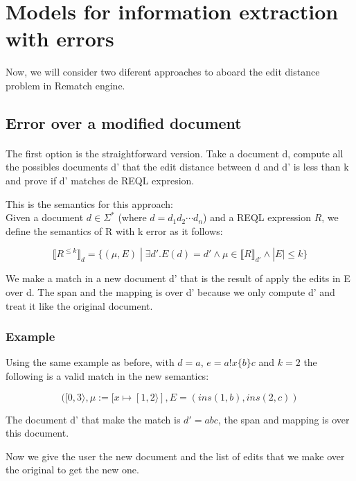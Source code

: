 \documentclass{article}
\begin{document}
\section{Models for information extraction with errors}

Now, we will consider two diferent approaches to aboard the edit distance problem in Rematch engine. 
\subsection{Error over a modified document}

\paragraph{}The first option is the straightforward version. Take a document d, compute all the possibles documents d' that the edit distance between d and d' is less than k and prove if d' matches de REQL expresion.

This is the semantics for this approach: \\

Given a document $d \in \Sigma^*$ (where $d = d_1d_2\cdots d_n$) and a REQL expression $R$, we define the semantics of R with k error as it follows:


\[ \llbracket R^{\leq k} \rrbracket_d = \{(\mu, E) \; | \; \exists d'. E(d) = d' \land \mu \in \llbracket R \rrbracket_{d'} \land | E | \leq k  \}\]


We make a match in a new document d' that is the result of apply the edits in E over d. The span and the mapping is over d' because we only compute d' and treat it like the original document.

\subsubsection{Example}

Using the same example as before, with $d = a$, $e= a!x\{b\}c$ and $k = 2$ the following is a valid match in the new semantics:

\[([0, 3\rangle, \mu := [x \mapsto [1, 2\rangle], E = (ins(1, b), ins(2,c))\]

The document d' that make the  match is $d' = abc$, the span and mapping is over this document.

Now we give the user the new document and the list of edits that we make over the original to get the new one.

\end{document}
